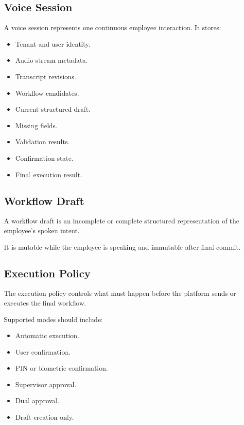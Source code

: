 \documentclass[11pt,a4paper]{article}
\begin{document}
\subsection{Voice Session}

A voice session represents one continuous employee interaction. It stores:

\begin{itemize}
\item Tenant and user identity.
\item Audio stream metadata.
\item Transcript revisions.
\item Workflow candidates.
\item Current structured draft.
\item Missing fields.
\item Validation results.
\item Confirmation state.
\item Final execution result.
\end{itemize}

\subsection{Workflow Draft}

A workflow draft is an incomplete or complete structured representation
of the employee's spoken intent.

It is mutable while the employee is speaking and immutable after final
commit.

\subsection{Execution Policy}

The execution policy controls what must happen before the platform sends
or executes the final workflow.

Supported modes should include:

\begin{itemize}
\item Automatic execution.
\item User confirmation.
\item PIN or biometric confirmation.
\item Supervisor approval.
\item Dual approval.
\item Draft creation only.
\end{itemize}
\end{document}
